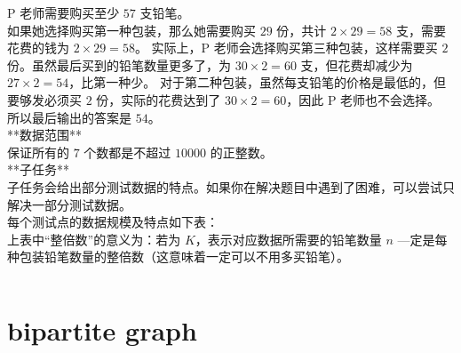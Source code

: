 \documentclass[12pt,twiside,a4paper]{ctexbook}
\numberwithin{chapter}{part}
\begin{document}
P 老师需要购买至少 $57$ 支铅笔。\\
如果她选择购买第一种包装，那么她需要购买 $29$ 份，共计 $2 \times 29 = 58$ 支，需要花费的钱为 $2 \times 29 = 58$。
实际上，P 老师会选择购买第三种包装，这样需要买 $2$ 份。虽然最后买到的铅笔数量更多了，为 $30 \times 2 = 60$ 支，但花费却减少为 $27 \times 2 = 54$，比第一种少。
对于第二种包装，虽然每支铅笔的价格是最低的，但要够发必须买 $2$ 份，实际的花费达到了 $30  \times 2 = 60$，因此 P 老师也不会选择。
所以最后输出的答案是 $54$。\\
**数据范围**\\
保证所有的 $7$ 个数都是不超过 $10000$ 的正整数。\\
**子任务**\\
子任务会给出部分测试数据的特点。如果你在解决题目中遇到了困难，可以尝试只解决一部分测试数据。\\
每个测试点的数据规模及特点如下表：\\
上表中“整倍数”的意义为：若为 $K$，表示对应数据所需要的铅笔数量 $n$ —定是每种包装铅笔数量的整倍数（这意味着一定可以不用多买铅笔）。
\begin{lstlisting}[language=C++,breaklines=true]

\end{lstlisting}

\chapter{bipartite graph}
\end{document}
